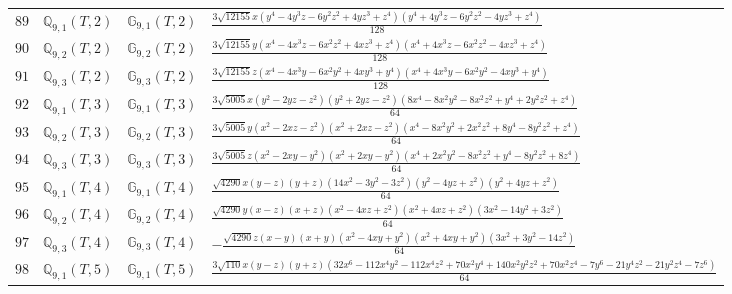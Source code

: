 \documentclass[fleqn,8pt,landscape]{jsarticle}
\begin{document}
\begin{table}[ht!]
\begin{center}
\begin{tabular}{cccl}
$ 89 $ & $ \mathbb{Q}_{9,1}(T,2) $ & $ \mathbb{G}_{9,1}(T,2) $ & $ \frac{3 \sqrt{12155} x \left(y^{4} - 4 y^{3} z - 6 y^{2} z^{2} + 4 y z^{3} + z^{4}\right) \left(y^{4} + 4 y^{3} z - 6 y^{2} z^{2} - 4 y z^{3} + z^{4}\right)}{128} $ \\
$ 90 $ & $ \mathbb{Q}_{9,2}(T,2) $ & $ \mathbb{G}_{9,2}(T,2) $ & $ \frac{3 \sqrt{12155} y \left(x^{4} - 4 x^{3} z - 6 x^{2} z^{2} + 4 x z^{3} + z^{4}\right) \left(x^{4} + 4 x^{3} z - 6 x^{2} z^{2} - 4 x z^{3} + z^{4}\right)}{128} $ \\
$ 91 $ & $ \mathbb{Q}_{9,3}(T,2) $ & $ \mathbb{G}_{9,3}(T,2) $ & $ \frac{3 \sqrt{12155} z \left(x^{4} - 4 x^{3} y - 6 x^{2} y^{2} + 4 x y^{3} + y^{4}\right) \left(x^{4} + 4 x^{3} y - 6 x^{2} y^{2} - 4 x y^{3} + y^{4}\right)}{128} $ \\
$ 92 $ & $ \mathbb{Q}_{9,1}(T,3) $ & $ \mathbb{G}_{9,1}(T,3) $ & $ \frac{3 \sqrt{5005} x \left(y^{2} - 2 y z - z^{2}\right) \left(y^{2} + 2 y z - z^{2}\right) \left(8 x^{4} - 8 x^{2} y^{2} - 8 x^{2} z^{2} + y^{4} + 2 y^{2} z^{2} + z^{4}\right)}{64} $ \\
$ 93 $ & $ \mathbb{Q}_{9,2}(T,3) $ & $ \mathbb{G}_{9,2}(T,3) $ & $ \frac{3 \sqrt{5005} y \left(x^{2} - 2 x z - z^{2}\right) \left(x^{2} + 2 x z - z^{2}\right) \left(x^{4} - 8 x^{2} y^{2} + 2 x^{2} z^{2} + 8 y^{4} - 8 y^{2} z^{2} + z^{4}\right)}{64} $ \\
$ 94 $ & $ \mathbb{Q}_{9,3}(T,3) $ & $ \mathbb{G}_{9,3}(T,3) $ & $ \frac{3 \sqrt{5005} z \left(x^{2} - 2 x y - y^{2}\right) \left(x^{2} + 2 x y - y^{2}\right) \left(x^{4} + 2 x^{2} y^{2} - 8 x^{2} z^{2} + y^{4} - 8 y^{2} z^{2} + 8 z^{4}\right)}{64} $ \\
$ 95 $ & $ \mathbb{Q}_{9,1}(T,4) $ & $ \mathbb{G}_{9,1}(T,4) $ & $ \frac{\sqrt{4290} x \left(y - z\right) \left(y + z\right) \left(14 x^{2} - 3 y^{2} - 3 z^{2}\right) \left(y^{2} - 4 y z + z^{2}\right) \left(y^{2} + 4 y z + z^{2}\right)}{64} $ \\
$ 96 $ & $ \mathbb{Q}_{9,2}(T,4) $ & $ \mathbb{G}_{9,2}(T,4) $ & $ \frac{\sqrt{4290} y \left(x - z\right) \left(x + z\right) \left(x^{2} - 4 x z + z^{2}\right) \left(x^{2} + 4 x z + z^{2}\right) \left(3 x^{2} - 14 y^{2} + 3 z^{2}\right)}{64} $ \\
$ 97 $ & $ \mathbb{Q}_{9,3}(T,4) $ & $ \mathbb{G}_{9,3}(T,4) $ & $ - \frac{\sqrt{4290} z \left(x - y\right) \left(x + y\right) \left(x^{2} - 4 x y + y^{2}\right) \left(x^{2} + 4 x y + y^{2}\right) \left(3 x^{2} + 3 y^{2} - 14 z^{2}\right)}{64} $ \\
$ 98 $ & $ \mathbb{Q}_{9,1}(T,5) $ & $ \mathbb{G}_{9,1}(T,5) $ & $ \frac{3 \sqrt{110} x \left(y - z\right) \left(y + z\right) \left(32 x^{6} - 112 x^{4} y^{2} - 112 x^{4} z^{2} + 70 x^{2} y^{4} + 140 x^{2} y^{2} z^{2} + 70 x^{2} z^{4} - 7 y^{6} - 21 y^{4} z^{2} - 21 y^{2} z^{4} - 7 z^{6}\right)}{64} $ \\

\end{tabular}
\end{center}
\end{table}
\end{document}
